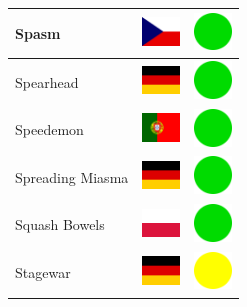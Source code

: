 \documentclass[12pt, a4paper, twoside]{report}
\begin{document}
\begin{center}
\begin{longtable}{|p{5cm}|p{2cm}|p{2cm}|}
Spasm & \includegraphics[width=1cm]{4x3/cz} & \includegraphics[width=1cm]{likes/y} \\ \hline
Spearhead & \includegraphics[width=1cm]{4x3/de} & \includegraphics[width=1cm]{likes/y} \\ \hline
Speedemon & \includegraphics[width=1cm]{4x3/pt} & \includegraphics[width=1cm]{likes/y} \\ \hline
Spreading Miasma & \includegraphics[width=1cm]{4x3/de} & \includegraphics[width=1cm]{likes/y} \\ \hline
Squash Bowels & \includegraphics[width=1cm]{4x3/pl} & \includegraphics[width=1cm]{likes/y} \\ \hline
Stagewar & \includegraphics[width=1cm]{4x3/de} & \includegraphics[width=1cm]{likes/m} \\ \hline

\end{longtable}
\end{center}
\end{document}
